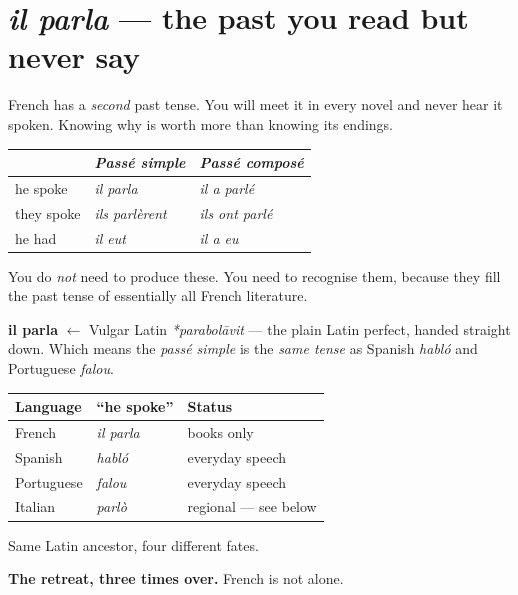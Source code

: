 \section{\emph{il parla} --- the past you read but never say}
\label{lesson:passe-simple}

French has a \emph{second} past tense. You will meet it in every novel and never
hear it spoken. Knowing why is worth more than knowing its endings.

\begin{center}
\begin{tabular}{@{}lll@{}}
\toprule
 & \emph{Pass\'{e} simple} & \emph{Pass\'{e} compos\'{e}} \\
\midrule
he spoke & \emph{il parla} & \emph{il a parl\'{e}} \\
they spoke & \emph{ils parl\`{e}rent} & \emph{ils ont parl\'{e}} \\
he had & \emph{il eut} & \emph{il a eu} \\
\bottomrule
\end{tabular}
\end{center}

You do \emph{not} need to produce these. You need to recognise them, because
they fill the past tense of essentially all French literature.

\begin{cousinweb}
\textbf{il parla} $\leftarrow$ Vulgar Latin \emph{*parabol\=avit} --- the plain
Latin perfect, handed straight down. Which means the \emph{pass\'{e} simple} is
the \emph{same tense} as Spanish \emph{habl\'{o}} and Portuguese \emph{falou}.
\end{cousinweb}

\begin{center}
\begin{tabular}{@{}lll@{}}
\toprule
Language & ``he spoke'' & Status \\
\midrule
French & \emph{il parla} & books only \\
Spanish & \emph{habl\'{o}} & everyday speech \\
Portuguese & \emph{falou} & everyday speech \\
Italian & \emph{parl\`{o}} & regional --- see below \\
\bottomrule
\end{tabular}
\end{center}

Same Latin ancestor, four different fates.

\begin{grammarlens}
\textbf{The retreat, three times over.} French is not alone.
\end{grammarlens}

